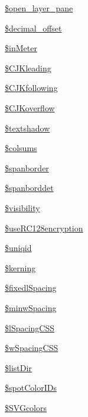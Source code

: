 \begin{DoxyCompactItemize}
\item 
\hyperlink{classm_p_d_f_a769092bae33b765db1403b25ef591695}{\$open\-\_\-layer\-\_\-pane}
\item 
\hyperlink{classm_p_d_f_a3277470c5f74feea4f2d38835a19b446}{\$decimal\-\_\-offset}
\item 
\hyperlink{classm_p_d_f_a417cc47cce5ea93fac0c4a0a66be3f24}{\$in\-Meter}
\item 
\hyperlink{classm_p_d_f_a12a0bf725cc37f3f8cec323b7b3a33d9}{\$\-C\-J\-Kleading}
\item 
\hyperlink{classm_p_d_f_aded18dfeb08e331513ae8b2b374d7cf2}{\$\-C\-J\-Kfollowing}
\item 
\hyperlink{classm_p_d_f_a568d3e8a6442e617e51b8860cb330599}{\$\-C\-J\-Koverflow}
\item 
\hyperlink{classm_p_d_f_a977abf882ac3566d4a82bd46ac23b3d1}{\$textshadow}
\item 
\hyperlink{classm_p_d_f_afde0ad773254d4b04701f96fcfff9b2f}{\$colsums}
\item 
\hyperlink{classm_p_d_f_acc973be801638bb187e7d9ac811652f2}{\$spanborder}
\item 
\hyperlink{classm_p_d_f_a77c01888c86281d62bcc4fcb7a9cdd4d}{\$spanborddet}
\item 
\hyperlink{classm_p_d_f_acffc0ef71fd538a7390b4188e80650d5}{\$visibility}
\item 
\hyperlink{classm_p_d_f_ad42eda0e0347fb913105bc9509ee4b85}{\$use\-R\-C128encryption}
\item 
\hyperlink{classm_p_d_f_a0cee5dd86653bfb742d11f239d2a665b}{\$uniqid}
\item 
\hyperlink{classm_p_d_f_a265803e76ed64c766fd64e26ace16d20}{\$kerning}
\item 
\hyperlink{classm_p_d_f_aab3a17ee1090bb197c3453783d23eb3e}{\$fixedl\-Spacing}
\item 
\hyperlink{classm_p_d_f_a2d19fe5b429cb195443d9a908ca70cea}{\$minw\-Spacing}
\item 
\hyperlink{classm_p_d_f_a25e2d271b7a085fbb4d138c1fe50d79d}{\$l\-Spacing\-C\-S\-S}
\item 
\hyperlink{classm_p_d_f_ae8e2a24321e5b9ce7716ca4c7178dd4e}{\$w\-Spacing\-C\-S\-S}
\item 
\hyperlink{classm_p_d_f_ada3bc9f66de84851b9e1e4726fa506b0}{\$list\-Dir}
\item 
\hyperlink{classm_p_d_f_a8c05322cbfc1a806f036330e8c3d94fc}{\$spot\-Color\-I\-Ds}
\item 
\hyperlink{classm_p_d_f_a75b4140ccbc8b1f5d821f5cd6a8f2729}{\$\-S\-V\-Gcolors}

\end{DoxyCompactItemize}
